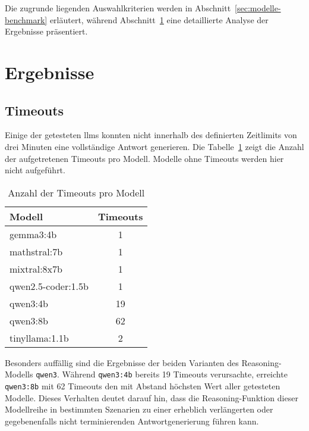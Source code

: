 Die zugrunde liegenden Auswahlkriterien werden in Abschnitt~\ref{sec:modelle-benchmark} erläutert,
während Abschnitt~\ref{sec:ergebnisse-benchmark} eine detaillierte Analyse der Ergebnisse präsentiert.


\section{Ergebnisse}\label{sec:ergebnisse-benchmark}


\subsection{Timeouts}

Einige der getesteten \glspl{llm} konnten nicht innerhalb des definierten Zeitlimits von drei Minuten eine vollständige Antwort generieren.
Die Tabelle~\ref{tab:model-timeouts} zeigt die Anzahl der aufgetretenen Timeouts pro Modell.
Modelle ohne Timeouts werden hier nicht aufgeführt.

\begin{table}[H]
    \centering
    \begin{tabular}{l c}
        \toprule
        \textbf{Modell} & \textbf{Timeouts} \\
        \midrule
        gemma3:4b            & 1  \\
        mathstral:7b         & 1  \\
        mixtral:8x7b         & 1  \\
        qwen2.5-coder:1.5b   & 1  \\
        qwen3:4b             & 19 \\
        qwen3:8b             & 62 \\
        tinyllama:1.1b       & 2  \\
        \bottomrule
    \end{tabular}
    \caption{Anzahl der Timeouts pro Modell}
    \label{tab:model-timeouts}
\end{table}

Besonders auffällig sind die Ergebnisse der beiden Varianten des Reasoning-Modells \texttt{qwen3}. Während \texttt{qwen3:4b} bereits 19 Timeouts verursachte, erreichte \texttt{qwen3:8b} mit 62 Timeouts den mit Abstand höchsten Wert aller getesteten Modelle.
Dieses Verhalten deutet darauf hin, dass die Reasoning-Funktion dieser Modellreihe in bestimmten Szenarien zu einer erheblich verlängerten oder gegebenenfalls nicht terminierenden Antwortgenerierung führen kann.

